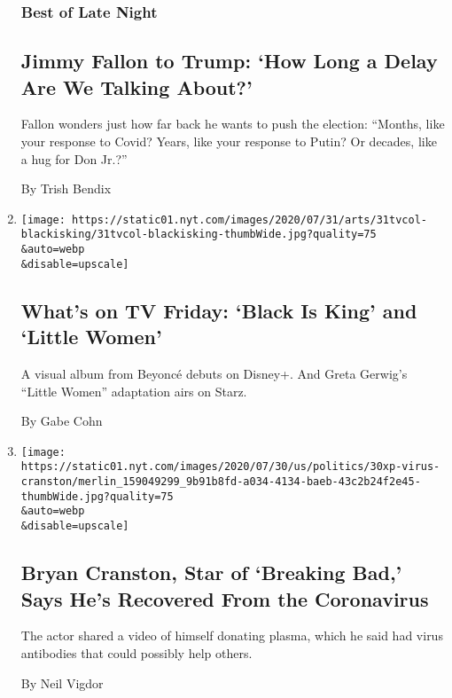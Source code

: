 \begin{enumerate}
  \hypertarget{best-of-late-night-1}{%
  \subsubsection{Best of Late Night}\label{best-of-late-night-1}}

  \hypertarget{jimmy-fallon-to-trump-how-long-a-delay-are-we-talking-about}{%
  \subsection{Jimmy Fallon to Trump: `How Long a Delay Are We Talking
  About?'}\label{jimmy-fallon-to-trump-how-long-a-delay-are-we-talking-about}}

  Fallon wonders just how far back he wants to push the election:
  ``Months, like your response to Covid? Years, like your response to
  Putin? Or decades, like a hug for Don Jr.?''

  By Trish Bendix
\item
  \href{/2020/07/31/arts/television/whats-on-tv-friday-black-is-king-and-little-women.html}{}

  \texttt{[image: https://static01.nyt.com/images/2020/07/31/arts/31tvcol-blackisking/31tvcol-blackisking-thumbWide.jpg?quality=75\\\&auto=webp\\\&disable=upscale]}

  \hypertarget{whats-on-tv-friday-black-is-king-and-little-women}{%
  \subsection{What's on TV Friday: `Black Is King' and `Little
  Women'}\label{whats-on-tv-friday-black-is-king-and-little-women}}

  A visual album from Beyoncé debuts on Disney+. And Greta Gerwig's
  ``Little Women'' adaptation airs on Starz.

  By Gabe Cohn
\item
  \href{/2020/07/31/arts/television/bryan-cranston-coronavirus-plasma.html}{}

  \texttt{[image: https://static01.nyt.com/images/2020/07/30/us/politics/30xp-virus-cranston/merlin\_159049299\_9b91b8fd-a034-4134-baeb-43c2b24f2e45-thumbWide.jpg?quality=75\\\&auto=webp\\\&disable=upscale]}

  \hypertarget{bryan-cranston-star-of-breaking-bad-says-hes-recovered-from-the-coronavirus}{%
  \subsection{Bryan Cranston, Star of `Breaking Bad,' Says He's
  Recovered From the
  Coronavirus}\label{bryan-cranston-star-of-breaking-bad-says-hes-recovered-from-the-coronavirus}}

  The actor shared a video of himself donating plasma, which he said had
  virus antibodies that could possibly help others.

  By Neil Vigdor
\end{enumerate}


